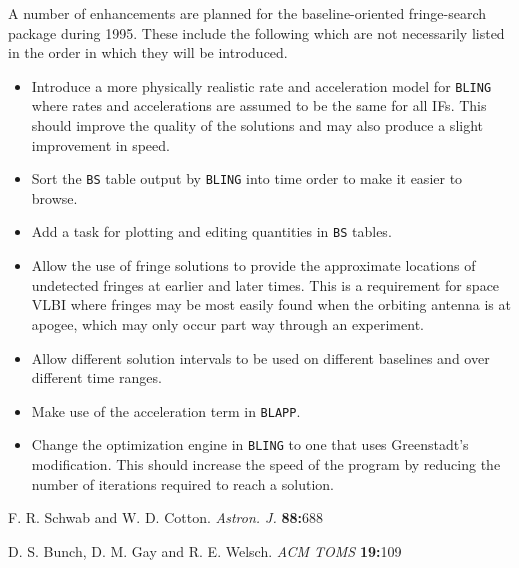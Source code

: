 A number of enhancements are planned for the baseline-oriented
fringe-search package during 1995.  These include the following which
are not necessarily listed in the order in which they will be
introduced.
\begin{itemize}

\item
Introduce a more physically realistic rate and acceleration model for
{\tt BLING} where rates and accelerations are assumed to be the same
for all IFs.  This should improve the quality of the solutions and may
also produce a slight improvement in speed.

\item
Sort the {\tt BS} table output by {\tt BLING} into time order to make
it easier to browse.

\item
Add a task for plotting and editing quantities in {\tt BS} tables.

\item
Allow the use of fringe solutions to provide the approximate locations
of undetected fringes at earlier and later times.  This is a
requirement for space VLBI where fringes may be most easily found when
the orbiting antenna is at apogee, which may only occur part way
through an experiment.

\item
Allow different solution intervals to be used on different baselines
and over different time ranges.

\item
Make use of the acceleration term in {\tt BLAPP}.

\item
Change the optimization engine in {\tt BLING} to one that uses
Greenstadt's modification.  This should increase the speed of the
program by reducing the number of iterations required to reach a
solution.
\end{itemize}

\begin{thebibliography}{99}

 F. R. Schwab and W. D. Cotton. {\em Astron. J.}
	{\bf 88:}688

 D. S. Bunch, D. M. Gay and R. E. Welsch. {\em ACM
	TOMS} {\bf 19:}109

\end{thebibliography}


